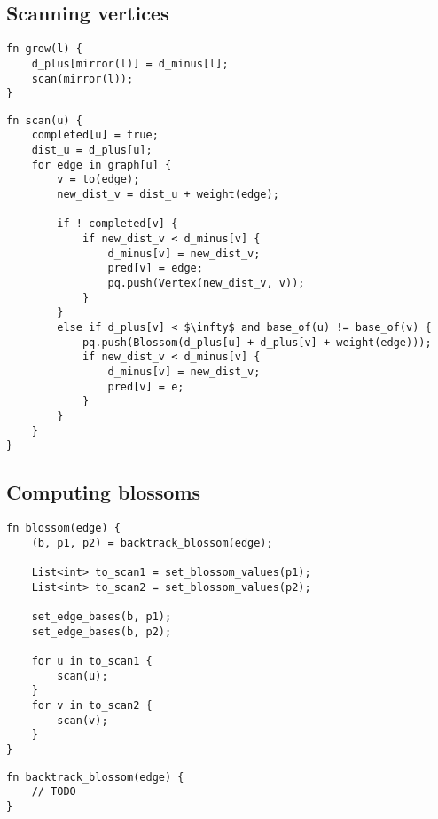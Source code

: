 \subsection{Scanning vertices}
\begin{lstlisting}[caption={Grow},label=Listing,mathescape=true]
fn grow(l) {
    d_plus[mirror(l)] = d_minus[l];
    scan(mirror(l));
}
\end{lstlisting}

\begin{lstlisting}[caption={Scan},label=Listing,mathescape=true]
fn scan(u) {
    completed[u] = true;
    dist_u = d_plus[u];
    for edge in graph[u] {
        v = to(edge);
        new_dist_v = dist_u + weight(edge);

        if ! completed[v] {
            if new_dist_v < d_minus[v] {
                d_minus[v] = new_dist_v;
                pred[v] = edge;
                pq.push(Vertex(new_dist_v, v));
            }
        }
        else if d_plus[v] < $\infty$ and base_of(u) != base_of(v) {
            pq.push(Blossom(d_plus[u] + d_plus[v] + weight(edge)));
            if new_dist_v < d_minus[v] {
                d_minus[v] = new_dist_v;
                pred[v] = e;
            }
        }
    }
}

\end{lstlisting}

\subsection{Computing blossoms}
\begin{lstlisting}[caption={Blossom},label=Listing,mathescape=true]
fn blossom(edge) {
    (b, p1, p2) = backtrack_blossom(edge);

    List<int> to_scan1 = set_blossom_values(p1);
    List<int> to_scan2 = set_blossom_values(p2);

    set_edge_bases(b, p1);
    set_edge_bases(b, p2);

    for u in to_scan1 {
        scan(u);
    }
    for v in to_scan2 {
        scan(v);
    }
}
\end{lstlisting}

\begin{lstlisting}[caption={Backtrack blossom},label=Listing,mathescape=true]
fn backtrack_blossom(edge) {
    // TODO
}
\end{lstlisting}


